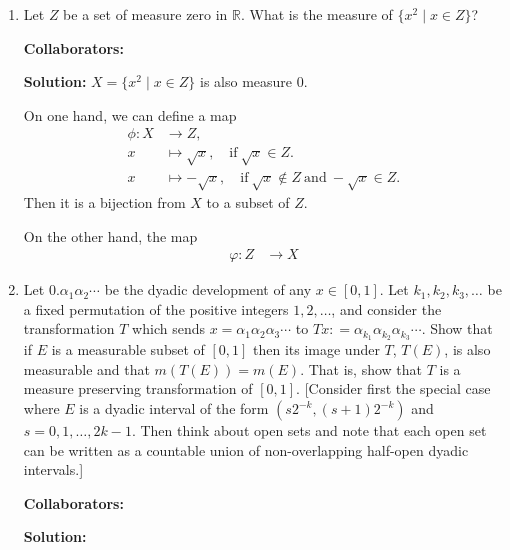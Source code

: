 \documentclass{article}%
\begin{document}
\begin{enumerate}
\bigskip





\item Let $Z$ be a set of measure zero in $\mathbb{R}$.  What is the measure of $\{x^2 \mid x\in Z\}$?



\bigskip
\textbf{Collaborators:}\\
\smallskip
 
\textbf{Solution:}
$X = \{x^2\mid x\in Z\}$ is also measure 0. 

On one hand, we can define a map 
$$
\begin{aligned}
\phi: X &\to Z, \\
x&\mapsto \sqrt{x}, \quad\text{if}~ \sqrt{x}\in Z. \\
x&\mapsto -\sqrt{x}, \quad\text{if}~ \sqrt{x}\notin Z ~\text{and}~ -\sqrt{x}\in Z.
\end{aligned}
$$
Then it is a bijection from $X$ to a subset of $Z$.

On the other hand, the map
$$
\begin{aligned}
\varphi: Z &\to X
\end{aligned}
$$
\bigskip


\item  Let $0.\alpha_1 \alpha_2 \cdots$ be the dyadic development of any $x\in[0,1]$. Let $k_1,k_2,k_3,\ldots$ be a fixed permutation of the positive integers $1,2,\ldots$, and consider the transformation $T$ which sends $x = \alpha_1\alpha_2\alpha_3\cdots$ to $Tx: = \alpha_{k_1}\alpha_{k_2}\alpha_{k_3}\cdots$. Show that if $E$ is a measurable subset of $[0,1]$ then its image under $T$, $T(E)$, is also measurable and that $m(T(E))= m(E)$.  That is, show that $T$ is a measure preserving transformation of $[0,1]$. [Consider first the special case where $E$ is a dyadic interval of the form $(s2^{-k}, (s+1)2^{-k})$ and $s = 0,1,\ldots, 2k-1$.  Then think about open sets and note that each open set can be written as a countable union of non-overlapping half-open dyadic intervals.]

\bigskip
\textbf{Collaborators:}\\
\smallskip
 
\textbf{Solution:}
\bigskip


\end{enumerate}
\end{document}
